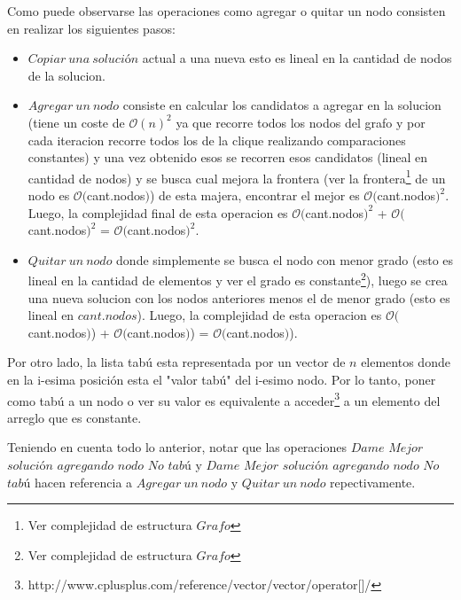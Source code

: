  Como puede observarse las operaciones como agregar o quitar un nodo consisten en realizar los siguientes pasos: \newline
\begin{itemize}
 \item $Copiar\ una\ solución$ actual a una nueva esto es lineal en la cantidad de nodos de la solucion.
 \item $Agregar\ un\ nodo$ consiste en calcular los candidatos a agregar en la solucion (tiene un coste de $\mathcal{O}(n)^{2}$ ya que recorre todos los nodos del grafo y por cada iteracion recorre todos los de la clique realizando comparaciones constantes) y una vez obtenido esos se recorren esos candidatos (lineal en cantidad de nodos) y se busca cual mejora la frontera (ver la frontera\footnote{Ver complejidad de estructura $Grafo$} de un nodo es $\mathcal{O}($cant.nodos$)$) de esta majera, encontrar el mejor es $\mathcal{O}($cant.nodos$)^{2}$. Luego, la complejidad final de esta operacion es $\mathcal{O}($cant.nodos$)^{2}$ + $\mathcal{O}($cant.nodos$)^{2}$ = $\mathcal{O}($cant.nodos$)^{2}$.
 \item $Quitar\ un\ nodo$ donde simplemente se busca el nodo con menor grado (esto es lineal en la cantidad de elementos y ver el grado es constante\footnote{Ver complejidad de estructura $Grafo$}), luego se crea una nueva solucion con los nodos anteriores menos el de menor grado (esto es lineal en $cant.nodos$). Luego, la complejidad de esta operacion es $\mathcal{O}($cant.nodos$)$) + $\mathcal{O}($cant.nodos$)$) = $\mathcal{O}($cant.nodos$)$).
\end{itemize}

 Por otro lado, la lista tabú esta representada por un vector de $n$ elementos donde en la i-esima posición esta el "valor tabú" del i-esimo nodo. Por lo tanto, poner como tabú a un nodo o ver su valor es equivalente a acceder\footnote{http://www.cplusplus.com/reference/vector/vector/operator[]/} a un elemento del arreglo que es constante.\newline

 Teniendo en cuenta todo lo anterior, notar que las operaciones $Dame$ $Mejor$ $solución$ $agregando$ $nodo$ $No$ $tabú$ y $Dame$ $Mejor$ $solución$ $agregando$ $nodo$ $No$ $tabú$ hacen referencia a $Agregar\ un\ nodo$ y $Quitar\ un\ nodo$ repectivamente.\newline

